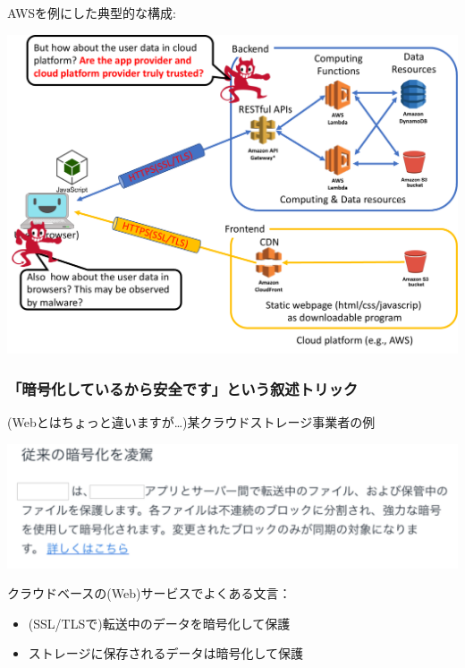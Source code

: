 \documentclass[12pt,dvipdfmx]{beamer}
\begin{document}
\begin{frame}
AWSを例にした典型的な構成:
\begin{center}
\includegraphics[width=0.85\linewidth]{Figs/spa3.pdf}
\end{center}
\end{frame}


\begin{frame}
\frametitle{「暗号化しているから安全です」という叙述トリック}

\begin{block}{\small (Webとはちょっと違いますが…)某クラウドストレージ事業者の例}
\begin{center}
\includegraphics[width=0.8\linewidth]{Figs/storage_enc.pdf}
\end{center} 
\end{block}

クラウドベースの(Web)サービスでよくある文言：
\begin{itemize}
 \item (SSL/TLSで)転送中のデータを暗号化して保護
 \item ストレージに保存されるデータは暗号化して保護
\end{itemize}
\end{frame}
\end{document}
